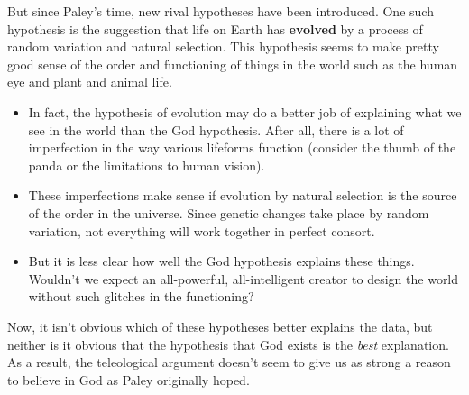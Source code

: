 \documentclass[letterpaper,10pt]{article}
\begin{document}
But since Paley's time, new rival hypotheses have been introduced.  One such hypothesis is the suggestion that life on Earth has \textbf{evolved} by a process of random variation and natural selection.  This hypothesis seems to make pretty good sense of the order and functioning of things in the world such as the human eye and plant and animal life.
\begin{itemize}
 \item In fact, the hypothesis of evolution may do a better job of explaining what we see in the world than the God hypothesis.  After all, there is a lot of imperfection in the way various lifeforms function (consider the thumb of the panda or the limitations to human vision).  
 \item These imperfections make sense if evolution by natural selection is the source of the order in the universe. Since genetic changes take place by random variation, not everything will work together in perfect consort.
 \item But it is less clear how well the God hypothesis explains these things.  Wouldn't we expect an all-powerful, all-intelligent creator to design the world without such glitches in the functioning?
\end{itemize}

Now, it isn't obvious which of these hypotheses better explains the data, but neither is it obvious that the hypothesis that God exists is the \textit{best} explanation. As a result, the teleological argument doesn't seem to give us as strong a reason to believe in God as Paley originally hoped.
\end{document}
